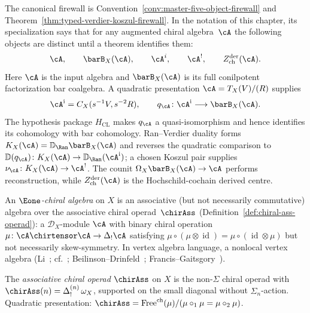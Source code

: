 \begin{remark}
\label{rem:five-object-firewall-algebraic-foundations}
The canonical firewall is
Convention~\ref{conv:master-five-object-firewall} and
Theorem~\ref{thm:typed-verdier-koszul-firewall}.  In the notation of
this chapter, its specialization says that for any augmented chiral
algebra~$\cA$ the following objects are distinct until a theorem
identifies them:
\[
\cA,\qquad
\barB_X(\cA),\qquad
\cA^i,\qquad
\cA^!,\qquad
Z^{\mathrm{der}}_{\mathrm{ch}}(\cA).
\]
Here $\cA$ is the input algebra and $\barB_X(\cA)$ is its full
conilpotent factorization bar coalgebra.  A quadratic presentation
$\cA=T_X(V)/(R)$ supplies
\[
\cA^{\mathrm i}=C_X(s^{-1}V,s^{-2}R),\qquad
q_\cA\colon\cA^{\mathrm i}\longrightarrow\barB_X(\cA).
\]
The hypothesis package $H_{\mathrm{CL}}$ makes $q_\cA$ a
quasi-isomorphism and hence identifies its cohomology with bar
cohomology.  Ran--Verdier duality forms
$K_X(\cA)=\mathbb D_{\Ran}\barB_X(\cA)$ and reverses the quadratic
comparison to
$\mathbb D(q_\cA)\colon K_X(\cA)\to
\mathbb D_{\Ran}(\cA^{\mathrm i})$; a chosen Koszul pair supplies
$\nu_\cA\colon K_X(\cA)\to\cA^!$.  The counit
$\Omega_X\barB_X(\cA)\to\cA$ performs reconstruction, while
$Z^{\mathrm{der}}_{\mathrm{ch}}(\cA)$ is the Hochschild-cochain
derived centre.
\end{remark}

\begin{definition}[\texorpdfstring{$\Eone$}{E1}-chiral algebra = nonlocal vertex algebra; \ClaimStatusDefinitional]
\label{def:e1-chiral}
An \emph{$\Eone$-chiral algebra} on $X$ is an associative (but not
necessarily commutative) algebra over the associative chiral
operad~$\chirAss$ (Definition~\ref{def:chiral-ass-operad}):
a $\mathcal{D}_X$-module $\cA$ with binary chiral operation
$\mu\colon \cA \chirtensor \cA \to \Delta_!\cA$
satisfying $\mu \circ (\mu \otimes \operatorname{id})
= \mu \circ (\operatorname{id} \otimes \mu)$
but not necessarily skew-symmetry.
In vertex algebra language, a nonlocal vertex algebra
(Li~\cite{Li96}; cf.~\cite[\S4.1]{HA};
Beilinson--Drinfeld~\cite[Theorem~3.4.9]{BD04};
Francis--Gaitsgory~\cite{FG12}).
\end{definition}

\begin{definition}
\label{def:chiral-ass-operad}
The \emph{associative chiral operad} $\chirAss$ on $X$ is the
non-$\Sigma$ chiral operad with
$\chirAss(n) = \Delta^{(n)}_!\, \omega_X$, supported on the small
diagonal without $\Sigma_n$-action. Quadratic presentation:
$\chirAss = \operatorname{Free}^{\mathrm{ch}}(\mu) /
(\mu \circ_1 \mu = \mu \circ_2 \mu)$.
\end{definition}

